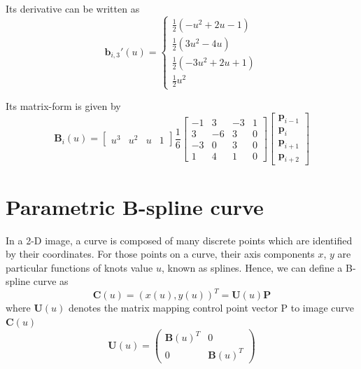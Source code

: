 Its derivative can be written as
\begin{equation}
  \label{eq:4.7}
  \mathbf{b}_{i,3}'(u) = \begin{cases} \frac{1}{2}(-u^2+2u-1) \\
    \frac{1}{2}(3u^2 -4u)\\ \frac{1}{2}(-3u^2+2u+1) \\
    \frac{1}{2}u^2
   \end{cases}
\end{equation}


Its matrix-form is given by
\begin{equation}
  \label{eq:4.8}
\mathbf{B}_i(u) = \begin{bmatrix} u^3 & u^2 & u & 1 \end{bmatrix} \frac{1}{6} \begin{bmatrix}
-1 &  3 & -3 & 1 \\
 3 & -6 &  3 & 0 \\
-3 &  0 &  3 & 0 \\
 1 &  4 &  1 & 0 \end{bmatrix}
\begin{bmatrix} \mathbf{p}_{i-1} \\ \mathbf{p}_{i} \\ \mathbf{p}_{i+1} \\ \mathbf{p}_{i+2} \end{bmatrix}
\end{equation}

\section{Parametric B-spline curve}
\label{sec:pbc}

In a 2-D image, a curve is composed of many discrete points which are
identified by their coordinates. For those points on a curve, their axis
components $x$, $y$ are particular functions of knots value $u$, known
as splines. Hence, we can define a B-spline curve as 
\begin{equation}
  \label{eq:4.11}
  \mathbf{C}(u) = (x(u),y(u))^T = \mathbf{U}(u) \mathbf{P}
\end{equation}
where $\mathbf{U}(u)$ denotes the matrix mapping control point vector P to image
curve $\mathbf{C}(u)$
\begin{equation}
  \label{eq:4.12}
  \mathbf{U}(u) =   \begin{pmatrix}
\mathbf{B}(u)^T & 0 \\
0 &\mathbf{B}(u)^T
  \end{pmatrix}
\end{equation}

